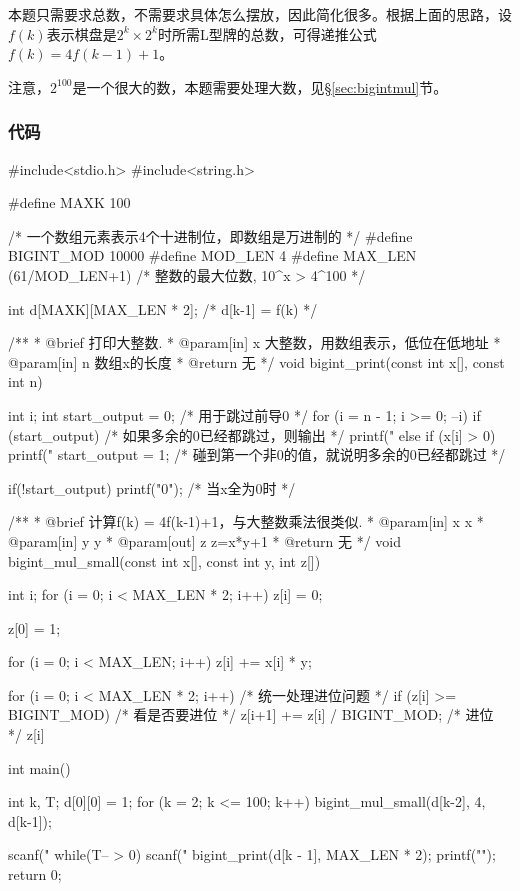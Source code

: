 本题只需要求总数，不需要求具体怎么摆放，因此简化很多。根据上面的思路，设$f(k)$表示棋盘是$2^k \times 2^k$时所需L型牌的总数，可得递推公式$f(k)=4f(k-1)+1$。

注意，$2^100$是一个很大的数，本题需要处理大数，见\S \ref{sec:bigintmul}节。

\subsubsection{代码}
\begin{Codex}[label=chessboard_cover.c]
#include<stdio.h>
#include<string.h>

#define MAXK 100

/* 一个数组元素表示4个十进制位，即数组是万进制的 */
#define BIGINT_MOD 10000
#define MOD_LEN 4
#define MAX_LEN (61/MOD_LEN+1)  /* 整数的最大位数, 10^x > 4^100 */

int  d[MAXK][MAX_LEN * 2];  /* d[k-1] = f(k) */

/**
 * @brief 打印大整数.
 * @param[in] x 大整数，用数组表示，低位在低地址
 * @param[in] n 数组x的长度
 * @return 无
 */
void bigint_print(const int x[], const int n) {
    int i;
    int start_output = 0;  /* 用于跳过前导0 */
    for (i = n - 1; i >= 0; --i) {
        if (start_output) {  /* 如果多余的0已经都跳过，则输出 */
            printf("%
        } else if (x[i] > 0) {
            printf("%
            start_output = 1; /* 碰到第一个非0的值，就说明多余的0已经都跳过 */
        }
    }

    if(!start_output) printf("0");  /* 当x全为0时 */
}

/**
 * @brief 计算f(k) = 4f(k-1)+1，与大整数乘法很类似.
 * @param[in] x x
 * @param[in] y y
 * @param[out] z z=x*y+1
 * @return 无
 */
void bigint_mul_small(const int x[], const int y, int z[]) {
    int i;
    for (i = 0; i < MAX_LEN * 2; i++) z[i] = 0;

    z[0] = 1;

    for (i = 0; i < MAX_LEN; i++) z[i] += x[i] * y;
    
    for (i = 0; i < MAX_LEN * 2; i++) {  /* 统一处理进位问题 */
        if (z[i] >= BIGINT_MOD) {  /* 看是否要进位 */
            z[i+1] += z[i] / BIGINT_MOD;  /* 进位 */
            z[i] %
        }
    }
}

int main() {
    int k, T;
    d[0][0] = 1;
    for (k = 2; k <= 100; k++) bigint_mul_small(d[k-2], 4, d[k-1]);

    scanf("%
    while(T-- > 0) {
        scanf("%
        bigint_print(d[k - 1], MAX_LEN * 2);
        printf("\n");
    }
    return 0;
}
\end{Codex}

